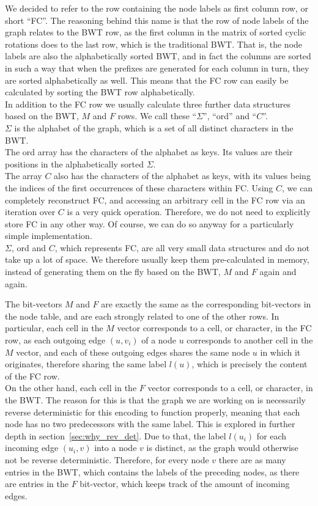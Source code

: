\documentclass[a4paper,12pt,twoside,BCOR=10mm]{scrbook}
\begin{document}
We decided to refer to the row containing the node labels as first column row, or short “FC”.
The reasoning behind this name is that the row of node labels of the graph relates to the BWT row,
as the first column in the matrix of sorted cyclic rotations does to the last row, which is the traditional BWT.
That is, the node labels are also the alphabetically sorted BWT, and in fact the columns are sorted in such a
way that when the prefixes are generated for each column in turn, they are sorted alphabetically as well.
This means that the FC row can easily be calculated by sorting the BWT row alphabetically. \\
In addition to the FC row
we usually calculate three further data structures based
on the BWT, $ M $ and $ F $ rows.
We call these “$ \Sigma $”, “ord” and “$ C $”. \\
$ \Sigma $ is the alphabet of the graph, which is a set of all distinct characters in the BWT. \\
The ord array has the characters of the alphabet as keys. 
Its values are their positions in the alphabetically sorted $ \Sigma $. \\
The array $ C $ also has the characters of the alphabet as keys, 
with its values being the indices of the first occurrences of these characters within FC.
Using $ C $, we can completely reconstruct FC, and accessing an arbitrary cell in the FC row
via an iteration over $ C $ is a very quick operation.
Therefore, we do not need to explicitly store FC in any other way.
Of course, we can do so anyway for a particularly simple implementation. \\
$ \Sigma $, ord and $ C $, which represents FC, are all very small data structures and do not take up a lot of space.
We therefore usually keep them pre-calculated in memory,
instead of generating them on the fly based on the BWT, $ M $ and $ F $ again and again.

The bit-vectors $ M $ and $ F $ are exactly the same as the corresponding bit-vectors in the node table,
and are each strongly related to one of the other rows.
In particular, each cell in the $ M $ vector corresponds to a cell, or character, in the FC row,
as each outgoing edge $ (u, v_i) $ of a node $ u $ corresponds to another cell in the $ M $ vector, and each
of these outgoing edges shares the same node $ u $ in which it originates, therefore sharing the same label $ l ( u ) $,
which is precisely the content of the FC row. \\
On the other hand, each cell in the $ F $ vector corresponds to a cell, or character, in the BWT.
The reason for this is that the graph we are working on is necessarily reverse deterministic
for this encoding to function properly, meaning that each node has no two predecessors with the same label.
This is explored in further depth in section~\ref{sec:why_rev_det}.
Due to that, the label $ l (u_i) $ for each incoming edge $ (u_i, v) $ into a node $ v $ is distinct,
as the graph would otherwise not be reverse deterministic.
Therefore, for every node $ v $ there are as many entries in the BWT, which contains the labels of the preceding nodes,
as there are entries in the $ F $ bit-vector, which keeps track of the amount of incoming edges.
\end{document}
